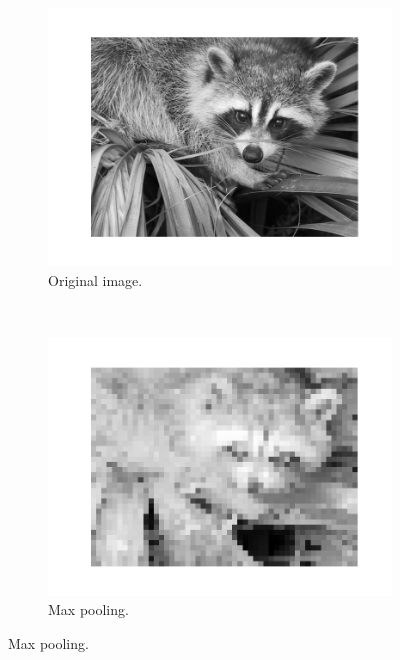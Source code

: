         \begin{figure}
            \centering
            \begin{subfigure}[t]{0.5\textwidth}
                \centering
                \includegraphics[width=\textwidth]{images/face.png}
                \caption{Original image.}
                \label{fig:pooling-face-original}
            \end{subfigure}%
            ~
            \begin{subfigure}[t]{0.5\textwidth}
                \centering
                \includegraphics[width=\textwidth]{images/face_max_pooled.png}
                \caption{Max pooling.}
                \label{fig:pooling-face-max}
            \end{subfigure}

\end{figure}
